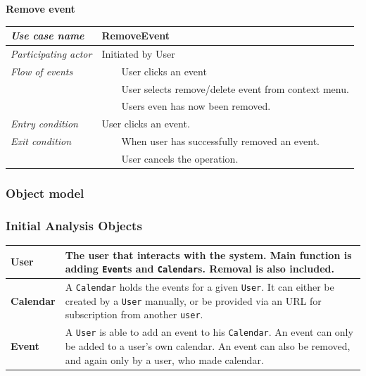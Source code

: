 \documentclass[10pt]{report}
\newcommand{\tabitem}{~~\llap{\textbullet}~~}
\numberwithin{equation}{section} %
\numberwithin{figure}{section} %
\numberwithin{table}{section} %
\begin{document}
\begin{table}[H]
\noindent \textbf{Remove event}\\
\begin{tabularx}{\textwidth}{l X}
\midrule
\textit{Use case name} & RemoveEvent \\ \midrule
\textit{Participating actor} & Initiated by User \\ \midrule
\textit{Flow of events} & \tabitem User clicks an event\\
                                       & \tabitem User selects remove/delete
                                       event from context menu.\\
                                       & \tabitem Users even has now been removed.\\
                        \midrule
\textit{Entry condition} & User clicks an event.\\ \midrule
\textit{Exit condition} & \tabitem When user has successfully removed an event. \\
						& \tabitem User cancels the operation.\\
                        \midrule
\end{tabularx}
\end{table}

\subsubsection{Object model}
\subsubsection{Initial Analysis Objects}
\begin{table}[H]
\begin{tabularx}{\textwidth}{l X}
\midrule
\textbf{User} & The user that interacts with the system. Main function is adding
  \texttt{Event}s and \texttt{Calendar}s. Removal is also included.\\ \midrule
\textbf{Calendar} & A \texttt{Calendar} holds the events for a given
  \texttt{User}. It can either be created by a \texttt{User} manually, or be
  provided via an URL for subscription from another \texttt{user}. \\ \midrule
\textbf{Event} & A \texttt{User} is able to add an event to his
  \texttt{Calendar}. An event can only be added to a user's own calendar. An event can also be removed, and again only by a user, who made calendar.\\ \midrule
\end{tabularx}
\end{table}
\end{document}
